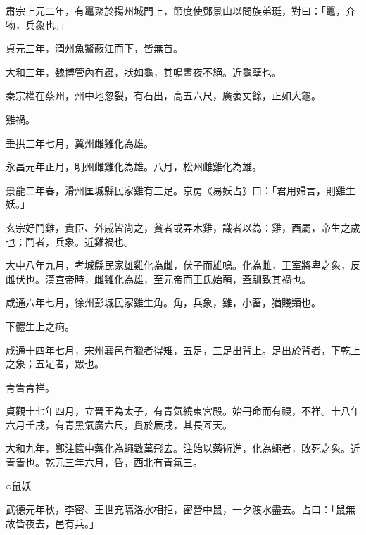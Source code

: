 \begin{pinyinscope}
 肅宗上元二年，有鼉聚於揚州城門上，節度使鄧景山以問族弟珽，對曰：「鼉，介物，兵象也。」



 貞元三年，潤州魚鱉蔽江而下，皆無首。



 大和三年，魏博管內有蟲，狀如龜，其鳴晝夜不絕。近龜孽也。



 秦宗權在蔡州，州中地忽裂，有石出，高五六尺，廣袤丈餘，正如大龜。



 雞禍。



 垂拱三年七月，冀州雌雞化為雄。



 永昌元年正月，明州雌雞化為雄。八月，松州雌雞化為雄。



 景龍二年春，滑州匡城縣民家雞有三足。京房《易妖占》曰：「君用婦言，則雞生妖。」



 玄宗好鬥雞，貴臣、外戚皆尚之，貧者或弄木雞，識者以為：雞，酉屬，帝生之歲也；鬥者，兵象。近雞禍也。



 大中八年九月，考城縣民家雄雞化為雌，伏子而雄鳴。化為雌，王室將卑之象，反雌伏也。漢宣帝時，雌雞化為雄，至元帝而王氏始萌，蓋馴致其禍也。



 咸通六年七月，徐州彭城民家雞生角。角，兵象，雞，小畜，猶賤類也。



 下體生上之痾。



 咸通十四年七月，宋州襄邑有獵者得雉，五足，三足出背上。足出於背者，下乾上之象；五足者，眾也。



 青眚青祥。



 貞觀十七年四月，立晉王為太子，有青氣繞東宮殿。始冊命而有祲，不祥。十八年六月壬戌，有青黑氣廣六尺，貫於辰戌，其長亙天。



 大和九年，鄭注篋中藥化為蠅數萬飛去。注始以藥術進，化為蠅者，敗死之象。近青眚也。乾元三年六月，昏，西北有青氣三。



 ○鼠妖



 武德元年秋，李密、王世充隔洛水相拒，密營中鼠，一夕渡水盡去。占曰：「鼠無故皆夜去，邑有兵。」




\end{pinyinscope}
